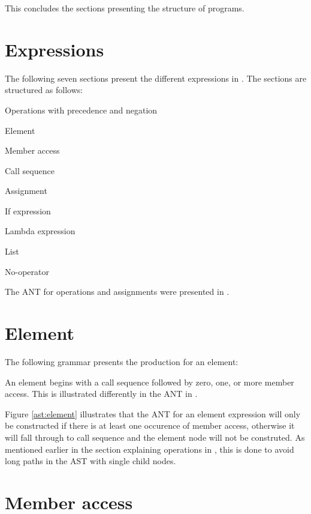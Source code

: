 This concludes the sections presenting the structure of programs.

\section{Expressions}
The following seven sections present the different expressions in
\productname{}. The sections are structured as follows:

\begin{dlist}
  \item Operations with precedence and negation
  \item Element
  \item Member access
  \item Call sequence
  \item Assignment
  \item If expression
  \item Lambda expression
  \item List
  \item No-operator
\end{dlist}

The ANT for operations and assignments were presented in .

\section{Element}
The following grammar presents the production for an element:

\begin{ebnf}
\end{ebnf}

An element begins with a call sequence followed by zero, one, or more member
access. This is illustrated differently in the ANT in .



Figure \ref{ast:element} illustrates that the ANT for an element expression will
only be constructed if there is at least one occurence of member access,
otherwise it will fall through to call sequence and the element node will not be
construted. As mentioned earlier in the section explaining operations in
\productname{}, this is done to avoid long paths in the AST with single child
nodes.

\section{Member access}

